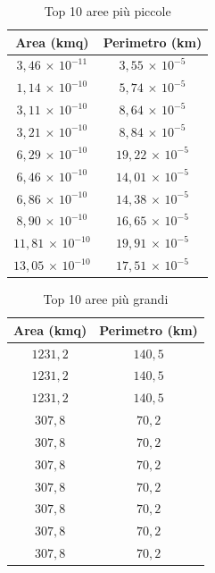 \begin{table}[h]
\centering
\begin{tabular}{|c|c|}
\hline
\rowcolor{lightgray}
Area (kmq)                  & Perimetro (km)             \\
\hline
$3,46$ $\times$ $10^{-11}$  & $3,55$ $\times$ $10^{-5}$  \\
\hline
$1,14$ $\times$ $10^{-10}$  & $5,74$ $\times$ $10^{-5}$  \\
\hline
$3,11$ $\times$ $10^{-10}$  & $8,64$ $\times$ $10^{-5}$  \\
\hline
$3,21$ $\times$ $10^{-10}$  & $8,84$ $\times$ $10^{-5}$  \\
\hline
$6,29$ $\times$ $10^{-10}$  & $19,22$ $\times$ $10^{-5}$ \\
\hline
$6,46$ $\times$ $10^{-10}$  & $14,01$ $\times$ $10^{-5}$ \\
\hline
$6,86$ $\times$ $10^{-10}$  & $14,38$ $\times$ $10^{-5}$ \\
\hline
$8,90$ $\times$ $10^{-10}$  & $16,65$ $\times$ $10^{-5}$ \\
\hline
$11,81$ $\times$ $10^{-10}$ & $19,91$ $\times$ $10^{-5}$ \\
\hline
$13,05$ $\times$ $10^{-10}$ & $17,51$ $\times$ $10^{-5}$ \\
\hline
\end{tabular}
\caption{Top 10 aree più piccole}
\label{topMin}
\end{table}

\begin{table}[h]
\centering
\begin{tabular}{|c|c|}
\hline
\rowcolor{lightgray}
Area (kmq) & Perimetro (km) \\ \hline
$1231,2$   & $140,5$          \\ \hline
$1231,2$   & $140,5$         \\ \hline
$1231,2$   & $140,5$          \\ \hline
$307,8$    & $70,2$           \\ \hline
$307,8$    & $70,2$           \\ \hline
$307,8$    & $70,2$           \\ \hline
$307,8$    & $70,2$           \\ \hline
$307,8$    & $70,2$           \\ \hline
$307,8$    & $70,2$           \\ \hline
$307,8$    & $70,2$          \\ \hline
\end{tabular}
\caption{Top 10 aree più grandi}
\label{topMax}
\end{table}


